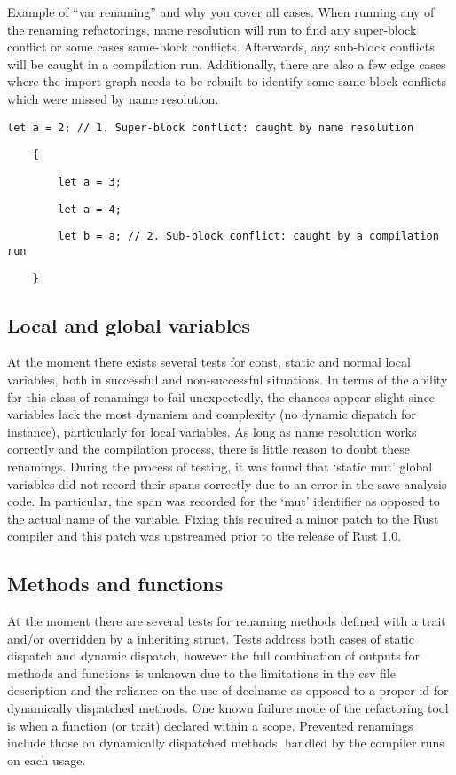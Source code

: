 Example of “var renaming” and why you cover all cases. When running any of the renaming refactorings, name resolution will run to find any super-block conflict or some cases same-block conflicts. Afterwards, any sub-block conflicts will be caught in a compilation run. Additionally, there are also a few edge cases where the import graph needs to be rebuilt to identify some same-block conflicts which were missed by name resolution.
\begin{fig}
{\verb|let a = 2; // 1. Super-block conflict: caught by name resolution|}

{\verb|    {|}

{\verb|        let |}{\color{red}\verb|a|}{\verb| = 3;|}

{\verb|        let a = 4;|}

{\verb|        let b = |}{\color{red}\verb|a|}{\verb|; // 2. Sub-block conflict: caught by a compilation run|}

{\verb|    }|}
\caption{Examining a tentative rename in red}
\label{Fig:walk}
\end{fig}

\subsection{Local and global variables}
At the moment there exists several tests for const, static and normal local variables, both in successful and non-successful situations. In terms of the ability for this class of renamings to fail unexpectedly, the chances appear slight since variables lack the most dynanism and complexity (no dynamic dispatch for instance), particularly for local variables. As long as name resolution works correctly and the compilation process, there is little reason to doubt these renamings. During the process of testing, it was found that `static mut' global variables did not record their spans correctly due to an error in the save-analysis code. In particular, the span was recorded for the `mut' identifier as opposed to the actual name of the variable. Fixing this required a minor patch to the Rust compiler and this patch was upstreamed prior to the release of Rust 1.0.


\subsection{Methods and functions}
At the moment there are several tests for renaming methods defined with a trait and/or overridden by a inheriting struct. Tests address both cases of static dispatch and dynamic dispatch, however the full combination of outputs for methods and functions is unknown due to the limitations in the csv file description and the reliance on the use of declname as opposed to a proper id for dynamically dispatched methods. One known failure mode of the refactoring tool is when a function (or trait) declared within a scope. Prevented renamings include those on dynamically dispatched methods, handled by the compiler runs on each usage.

